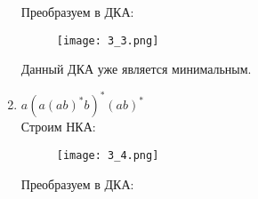 \documentclass[12pt, a4paper]{article}
\begin{document}
\begin{enumerate}
Преобразуем в ДКА:

\begin{comment}
digraph {
    rankdir="LR"
    "" [shape=point]
    "{q1,q2,q5,q9}" [shape=circle]
    "{q3,q7,q10}" [shape=doublecircle]
    "{q4,q8}" [shape=circle]
    "{q3,q7,q9,q10}" [shape=doublecircle]

    "" -> "{q1,q2,q5,q9}"
    "{q1,q2,q5,q9}" -> "{q3,q7,q10}" [label="a"]
    "{q3,q7,q10}" -> "{q4,q8}" [label="b"]
    "{q4,q8}" -> "{q3,q7,q9,q10}" [label="a"]
    "{q3,q7,q9,q10}" -> "{q4,q8}" [label="b"]
    "{q3,q7,q9,q10}" -> "{q3,q7,q10}" [label="a"]
}
\end{comment}
    \begin{figure}[H]
        \centering
        \texttt{[image: 3\_3.png]}
    \end{figure}
    
Данный ДКА уже является минимальным.

    \item \(a(a(ab)^*b)^*(ab)^*\)
\\Строим НКА:
\begin{comment}
digraph {
    rankdir="LR"
    "" [shape=point]
    q1 [shape=circle]
    q2 [shape=circle]
    q3 [shape=circle]
    q4 [shape=circle]
    q5 [shape=circle]
    q6 [shape=doublecircle]
    q7 [shape=circle]
    q8 [shape=doublecircle]

    "" -> q1
    q1 -> q2 [label="a"]
    q1 -> q8 [label="a"]
    q2 -> q3 [label="a"]
    q3 -> q4 [label="a"]
    q3 -> q6 [label="b"]
    q4 -> q5 [label="b"]
    q5 -> q4 [label="a"]
    q5 -> q6 [label="b"]
    q6 -> q7 [label="a"]
    q7 -> q8 [label="b"]
    q8 -> q7 [label="a"]
}
\end{comment}

    \begin{figure}[H]
        \centering
        \texttt{[image: 3\_4.png]}
    \end{figure}
    
Преобразуем в ДКА:

\begin{comment}
digraph {
    rankdir="LR"
    "" [shape=point]
    q1 [shape=circle]
    "{q2,q8}" [shape=doublecircle]
    "{q3,q7}" [shape=circle]
    "{q6,q8}" [shape=doublecircle]
    q4 [shape=circle]
    q5 [shape=circle]
    q6 [shape=doublecircle]

    "" -> q1
    q1 -> "{q2,q8}" [label="a"]
    "{q2,q8}" -> "{q3,q7}" [label="a"]
    "{q3,q7}" -> q4 [label="a"]
    "{q3,q7}" -> "{q6,q8}" [label="b"]
    q4 -> q5 [label="b"]
    q5 -> q4 [label="a"]
    q5 -> q6 [label="b"]
    q6 -> "{q3,q7}" [label="a"]
    "{q6,q8}" -> "{q3,q7}" [label="a"]
}
\end{comment}


\end{enumerate}
\end{document}
